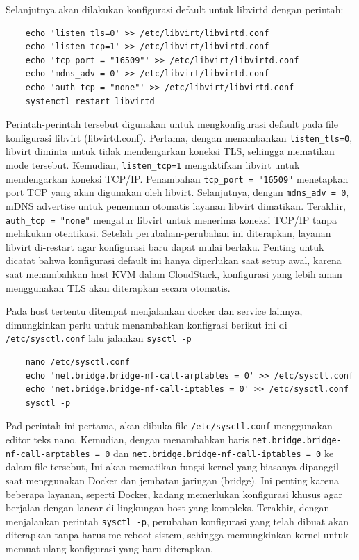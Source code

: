 Selanjutnya akan dilakukan konfigurasi default untuk libvirtd dengan perintah:

\begin{lstlisting}
    echo 'listen_tls=0' >> /etc/libvirt/libvirtd.conf
    echo 'listen_tcp=1' >> /etc/libvirt/libvirtd.conf
    echo 'tcp_port = "16509"' >> /etc/libvirt/libvirtd.conf
    echo 'mdns_adv = 0' >> /etc/libvirt/libvirtd.conf
    echo 'auth_tcp = "none"' >> /etc/libvirt/libvirtd.conf
    systemctl restart libvirtd
\end{lstlisting}

Perintah-perintah tersebut digunakan untuk mengkonfigurasi default pada file konfigurasi libvirt (libvirtd.conf). Pertama, dengan menambahkan \texttt{listen\_tls=0}, libvirt diminta untuk tidak mendengarkan koneksi TLS, sehingga mematikan mode tersebut. Kemudian, \texttt{listen\_tcp=1} mengaktifkan libvirt untuk mendengarkan koneksi TCP/IP. Penambahan \texttt{tcp\_port = "16509"} menetapkan port TCP yang akan digunakan oleh libvirt. Selanjutnya, dengan \texttt{mdns\_adv = 0}, mDNS advertise untuk penemuan otomatis layanan libvirt dimatikan. Terakhir, \texttt{auth\_tcp = "none"} mengatur libvirt untuk menerima koneksi TCP/IP tanpa melakukan otentikasi. Setelah perubahan-perubahan ini diterapkan, layanan libvirt di-restart agar konfigurasi baru dapat mulai berlaku. Penting untuk dicatat bahwa konfigurasi default ini hanya diperlukan saat setup awal, karena saat menambahkan host KVM dalam CloudStack, konfigurasi yang lebih aman menggunakan TLS akan diterapkan secara otomatis.

Pada host tertentu ditempat menjalankan docker dan service lainnya, dimungkinkan perlu untuk menambahkan konfigrasi berikut ini di \texttt{/etc/sysctl.conf} lalu jalankan \texttt{sysctl -p}

\begin{lstlisting}
    nano /etc/sysctl.conf
    echo 'net.bridge.bridge-nf-call-arptables = 0' >> /etc/sysctl.conf
    echo 'net.bridge.bridge-nf-call-iptables = 0' >> /etc/sysctl.conf
    sysctl -p
\end{lstlisting}

Pad perintah ini pertama, akan dibuka file \texttt{/etc/sysctl.conf} menggunakan editor teks nano. Kemudian, dengan menambahkan baris \texttt{net.bridge.bridge-nf-call-arptables = 0} dan \texttt{net.bridge.bridge-nf-call-iptables = 0} ke dalam file tersebut, Ini akan mematikan fungsi kernel yang biasanya dipanggil saat menggunakan Docker dan jembatan jaringan (bridge). Ini penting karena beberapa layanan, seperti Docker, kadang memerlukan konfigurasi khusus agar berjalan dengan lancar di lingkungan host yang kompleks. Terakhir, dengan menjalankan perintah \texttt{sysctl -p}, perubahan konfigurasi yang telah dibuat akan diterapkan tanpa harus me-reboot sistem, sehingga memungkinkan kernel untuk memuat ulang konfigurasi yang baru diterapkan.

